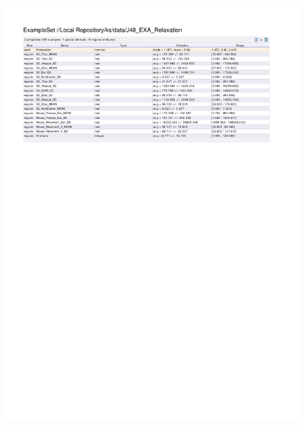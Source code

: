 \begin{figure}[htp]
  \centerline{\includegraphics[trim=0 560 0 60,clip,width=16.09cm]{results/J48_EXA_Relaxation.pdf}} \caption{
} \label{J48_K_Relaxation}
\end{figure}

